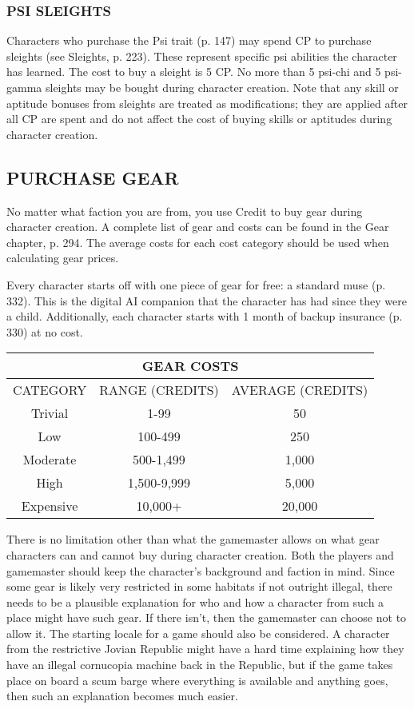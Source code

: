 \subsubsection{PSI SLEIGHTS}
Characters who purchase the Psi trait (p. 147) may spend CP to purchase
sleights (see Sleights, p. 223).  These represent specific psi abilities the
character has learned. The cost to buy a sleight is 5 CP. No more than 5
psi-chi and 5 psi-gamma sleights may be bought during character creation.  Note
that any skill or aptitude bonuses from sleights are treated as modifications;
they are applied after all CP are spent and do not affect the cost of buying
skills or aptitudes during character creation.

\subsection{PURCHASE GEAR}

No matter what faction you are from, you use Credit to buy gear during
character creation. A complete list of gear and costs can be found in the Gear
chapter, p.  294. The average costs for each cost category should be used when
calculating gear prices.
                
Every character starts off with one piece of gear for free: a standard muse
(p. 332). This is the digital AI companion that the character has had since
they were a child. Additionally, each character starts with 1 month of backup
insurance (p. 330) at no cost.

\begin{center}
  \begin{tabular}{|c|c|c|}
    \hline
    \multicolumn{3}{|c|}{GEAR COSTS} \\
    \hline
    CATEGORY & RANGE (CREDITS) & AVERAGE (CREDITS)\\ 
    \hline
    Trivial & 1-99 & 50\\ 
    \hline
    Low & 100-499 & 250\\ 
    \hline
    Moderate & 500-1,499 & 1,000\\ 
    \hline
    High & 1,500-9,999 & 5,000\\ 
    \hline
    Expensive & 10,000+ & 20,000\\ 
    \hline
  \end{tabular}
\end{center}

There is no limitation other than what the gamemaster allows on what gear
characters can and cannot buy during character creation. Both the players and
gamemaster should keep the character’s background and faction in mind. Since
some gear is likely very restricted in some habitats if not outright illegal,
there needs to be a plausible explanation for who and how a character from such
a place might have such gear.  If there isn’t, then the gamemaster can choose
not to allow it. The starting locale for a game should also be considered. A
character from the restrictive Jovian Republic might have a hard time
explaining how they have an illegal cornucopia machine back in the Republic,
but if the game takes place on board a scum barge where everything is available
and anything goes, then such an explanation becomes much easier.

